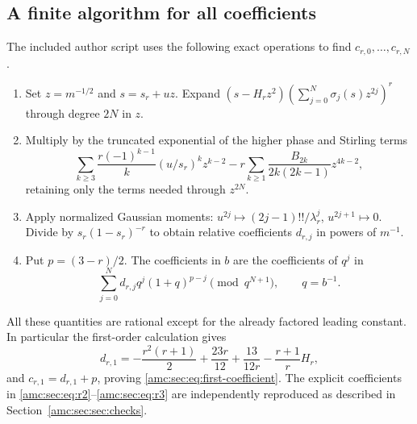 \documentclass[11pt,letterpaper]{article}
\theoremstyle{remark}\newtheorem{remark}[theorem]{Remark}
\begin{document}
\subsection{A finite algorithm for all coefficients}
The included author script uses the following exact operations to find $c_{r,0},\ldots,c_{r,N}$.
\begin{enumerate}
\item Set $z=m^{-1/2}$ and $s=s_r+uz$. Expand
$(s-H_rz^2)(\sum_{j=0}^N\sigma_j(s)z^{2j})^r$ through degree $2N$ in $z$.
\item Multiply by the truncated exponential of the higher phase and Stirling terms
\[
 \sum_{k\ge3}\frac{r(-1)^{k-1}}{k}(u/s_r)^kz^{k-2}
 -r\sum_{k\ge1}\frac{B_{2k}}{2k(2k-1)}z^{4k-2},
\]
retaining only the terms needed through $z^{2N}$.
\item Apply normalized Gaussian moments: $u^{2j}\mapsto(2j-1)!!/\lambda_r^j$, $u^{2j+1}\mapsto0$. Divide by $s_r(1-s_r)^{-r}$ to obtain relative coefficients $d_{r,j}$ in powers of $m^{-1}$.
\item Put $p=(3-r)/2$. The coefficients in $b$ are the coefficients of $q^j$ in
\[
 \sum_{j=0}^N d_{r,j}q^j(1+q)^{p-j}\pmod{q^{N+1}},\qquad q=b^{-1}.
\]
\end{enumerate}
All these quantities are rational except for the already factored leading constant. In particular the first-order calculation gives
\[
 d_{r,1}=-\frac{r^2(r+1)}2+\frac{23r}{12}
          +\frac{13}{12r}-\frac{r+1}{r}H_r,
\]
and $c_{r,1}=d_{r,1}+p$, proving \eqref{amc:sec:eq:first-coefficient}. The explicit coefficients in \eqref{amc:sec:eq:r2}--\eqref{amc:sec:eq:r3} are independently reproduced as described in Section~\ref{amc:sec:sec:checks}.
\end{document}
